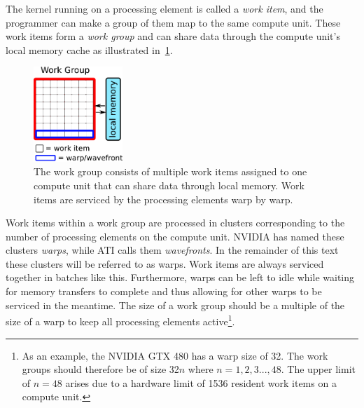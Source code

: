 \documentclass[11pt,twoside]{report}
\begin{document}
\indent The kernel running on a processing element is called a {\it work item}, and the programmer can make a group of them map to the same compute unit. These work items form a {\it work group} and can share data through the compute unit's local memory cache as illustrated in~\cref{fig:the_wg}. %

\begin{figure}[htbp]
	\begin{center}
	\vspace{-10pt}
  \includegraphics[width=0.30\textwidth]{img/work_group.pdf}
	\end{center}
  \caption{The work group consists of multiple work items assigned to one compute unit that can share data through local memory. Work items are serviced by the processing elements warp by warp.}
	\label{fig:the_wg}
	\vspace{-5pt}
\end{figure}

\indent Work items within a work group are processed in clusters corresponding to the number of processing elements on the compute unit.  NVIDIA has named these clusters {\it warps}, while ATI calls them {\it wavefronts}.  In the remainder of this text these clusters will be referred to as warps. Work items are always serviced together in batches like this. Furthermore, warps can be left to idle while waiting for memory transfers to complete and thus allowing for other warps to be serviced in the meantime. The size of a work group should be a multiple of the size of a warp to keep all processing elements active\footnote{As an example, the NVIDIA GTX 480 has a warp size of 32.  The work groups should therefore be of size 32$n$ where $n = 1,2,3...,48$. The upper limit of $n = 48$ arises due to a hardware limit of 1536 resident work items on a compute unit.}.
\end{document}
